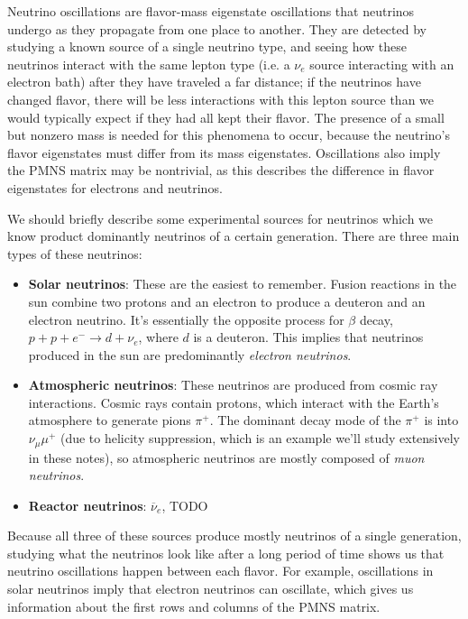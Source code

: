 \documentclass[11pt, oneside]{article}   	%
\theoremstyle{definition}
\numberwithin{equation}{subsection}		%
\begin{document}
Neutrino oscillations are flavor-mass eigenstate oscillations that neutrinos undergo as they propagate from one place to another. 
They are detected by studying a known source of a single neutrino type, and seeing how these neutrinos interact with the same 
lepton type (i.e. a $\nu_e$ source interacting with an electron bath) after they have traveled a far distance; if the neutrinos have 
changed flavor, there will be less interactions with this lepton source than we would typically expect if they had all kept their 
flavor. The presence of a small but nonzero mass is needed for this phenomena to occur, because the neutrino's flavor eigenstates must 
differ from its mass eigenstates. Oscillations also imply the PMNS matrix may be nontrivial, as this describes the difference in flavor 
eigenstates for electrons and neutrinos. 

We should briefly describe some experimental sources for neutrinos which we know product dominantly 
neutrinos of a certain generation. There are three main types of these neutrinos:
\begin{itemize}
	\item \textbf{Solar neutrinos}: These are the easiest to remember. Fusion reactions in the sun combine two protons and an electron 
	to produce a deuteron and an electron neutrino. It's essentially the opposite process for $\beta$ decay, $p + p + e^-
	\rightarrow d + \nu_e$, where $d$ is a deuteron. This implies that neutrinos produced in the sun are predominantly \textit{electron neutrinos}. 
	\item \textbf{Atmospheric neutrinos}: These neutrinos are produced from cosmic ray interactions. Cosmic rays contain protons, which 
	interact with the Earth's atmosphere to generate pions $\pi^+$. The dominant decay mode of the $\pi^+$ is into $\nu_\mu \mu^+$ 
	(due to helicity suppression, which is an example we'll study extensively in these notes), so atmospheric neutrinos are mostly 
	composed of \textit{muon neutrinos}. 
	\item \textbf{Reactor neutrinos}: $\overline\nu_e$, TODO
\end{itemize}
Because all three of these sources produce mostly neutrinos of a single generation, studying what the neutrinos look like after a long 
period of time shows us that neutrino oscillations happen between each flavor. For example, oscillations in solar neutrinos imply that 
electron neutrinos can oscillate, which gives us information about the first rows and columns of the PMNS matrix. 
\end{document}
